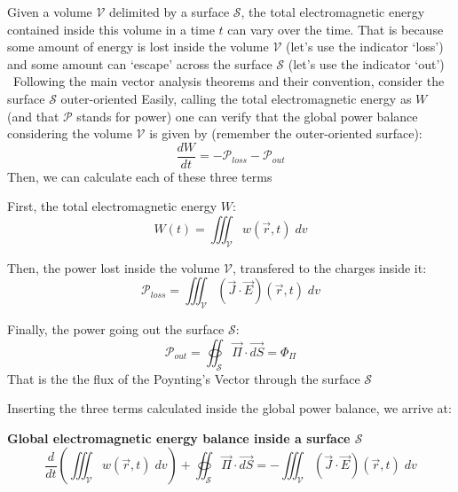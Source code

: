 \documentclass[11pt]{article}
\newcommand{\bigexclaim}{\raisebox{-0.1em}{\BigTriangleUp}\hspace{-0.32em}\llap{\small\textbf{!}}\hspace{0.32em}}
\theoremstyle{definition}
\begin{document}
Given a volume $\mathcal{V}$ delimited by a surface $\mathcal{S}$, the total electromagnetic energy contained inside this volume in a time $t$ can vary over the time.
That is because some amount of energy is lost inside the volume $\mathcal{V}$ (let's use the indicator `loss') and some amount can `escape' across the surface $\mathcal{S}$ (let's use the indicator `out')  
\newline
\newline
\bigexclaim \ Following the main vector analysis theorems and their convention, consider the surface $\mathcal{S}$ outer-oriented
\newline
\newline
Easily, calling the total electromagnetic energy as $W$ (and that $\mathcal{P}$ stands for power) one can verify that the global power balance considering the volume $\mathcal{V}$ is given by (remember the outer-oriented surface):
\begin{equation}
    \frac{dW}{dt} = -\mathcal{P}_{loss}-\mathcal{P}_{out}
\end{equation}
Then, we can calculate each of these three terms

First, the total electromagnetic energy $W$:
\begin{equation}
    W\left(t\right) = \iiint_{\mathcal{V}} w\left(\vec{r},t\right)\;dv
\end{equation}

Then, the power lost inside the volume $\mathcal{V}$, transfered to the charges inside it:
\begin{equation}
    \mathcal{P}_{loss} = \iiint_{\mathcal{V}} \left(\vec{J} \cdot \vec{E}\right)\left(\vec{r},t\right)\;dv
\end{equation}

Finally, the power going out the surface $\mathcal{S}$:
\begin{equation}
    \mathcal{P}_{out} = \oiint_{\mathcal{S}} \vec{\Pi} \cdot \vec{dS} = \Phi_{\Pi}
\end{equation}
That is the the flux of the Poynting's Vector through the surface $\mathcal{S}$

Inserting the three terms calculated inside the global power balance, we arrive at:
\begin{shaded}
    \textbf{Global electromagnetic energy balance inside a surface $\mathcal{S}$}
    \begin{equation}
        \frac{d}{dt}\left(\iiint_{\mathcal{V}} w\left(\vec{r},t\right)\;dv\right) + \oiint_{\mathcal{S}} \vec{\Pi} \cdot \vec{dS} = - \iiint_{\mathcal{V}} \left(\vec{J} \cdot \vec{E}\right)\left(\vec{r},t\right)\;dv
    \end{equation}
\end{shaded}
\end{document}
